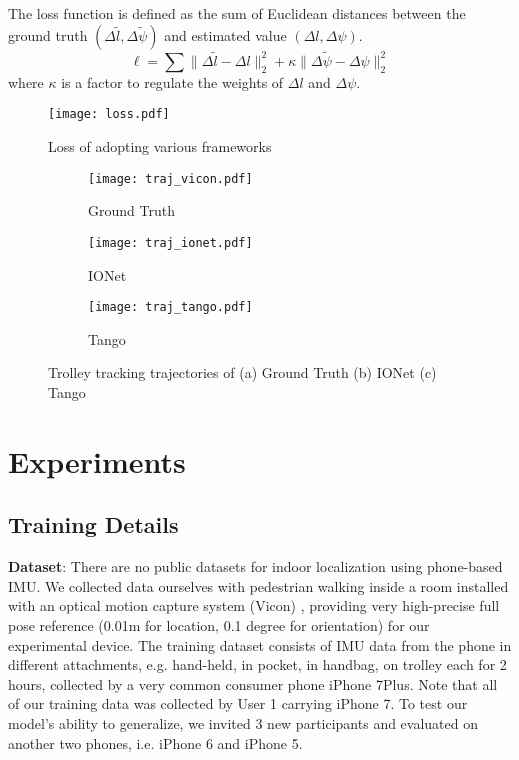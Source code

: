 \documentclass[letterpaper]{article}
\begin{document}
	The loss function is defined as the sum of Euclidean distances between the ground truth $(\Delta \tilde{l}, \Delta \tilde{\psi})$ and estimated value $(\Delta l, \Delta \psi)$. 
	\begin{equation}
    	\ell=\sum \|\Delta \tilde{l} - \Delta l \|_2^2+\kappa \|\Delta \tilde{\psi} - \Delta \psi \|_2^2
    \end{equation}
	where $\kappa$ is a factor to regulate the weights of $\Delta l$ and $\Delta \psi$.

	\begin{figure}
    	\centering
        \texttt{[image: loss.pdf]}
        \caption{\label{fig:loss}Loss of adopting various frameworks}
    \end{figure}

	 \begin{figure*}
    	\centering
        \begin{subfigure}[t]{0.32\textwidth}
        	\texttt{[image: traj\_vicon.pdf]}
        	\caption{\label{fig:traj_vicon} Ground Truth}
        \end{subfigure}
        \begin{subfigure}[t]{0.32\textwidth}
        	\texttt{[image: traj\_ionet.pdf]}
        	\caption{\label{fig:traj_ionet} IONet}
        \end{subfigure}
        \begin{subfigure}[t]{0.32\textwidth}
        	\texttt{[image: traj\_tango.pdf]}
        	\caption{\label{fig:traj_tango} Tango}
        \end{subfigure}
        \caption{\label{fig:traj_trolley} Trolley tracking trajectories of (a) Ground Truth (b) IONet (c) Tango}
    \end{figure*} 
 
\section{Experiments}

\subsection{Training Details}

	\textbf{Dataset}: There are no public datasets for indoor localization using phone-based IMU. We collected data ourselves with pedestrian walking inside a room installed with an optical motion capture system (Vicon) \cite{Vicon2017}, providing very high-precise full pose reference (0.01m for location, 0.1 degree for orientation) for our experimental device. The training dataset consists of IMU data from the phone in different attachments, e.g. hand-held, in pocket, in handbag, on trolley each for 2 hours, collected by a very common consumer phone iPhone 7Plus. Note that all of our training data was collected by User 1 carrying iPhone 7. To test our model's ability to generalize, we invited 3 new participants and evaluated on another two phones, i.e. iPhone 6 and iPhone 5. 
    
\end{document}

